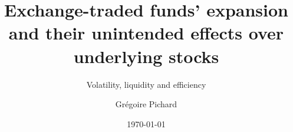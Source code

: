 \documentclass[a4paper, twoside, 10pt, titlepage, captions = tableheading]{scrartcl}
\title{Exchange-traded funds' expansion and their unintended effects over underlying stocks}
\subtitle{Volatility, liquidity and efficiency}
\date{\today}
\author{Grégoire Pichard}
\begin{document}
\maketitle
\renewcommand{\sectionautorefname}{Section}
\tableofcontents
\listoftables
\listoffigures
\clearpage

\clearpage






\clearpage
\printbibliography
\clearpage
\appendix



\end{document}
